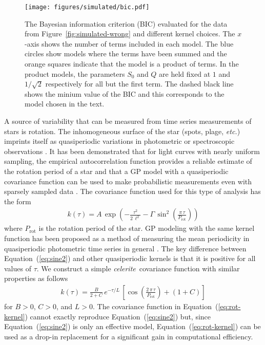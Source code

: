 \documentclass[manuscript, letterpaper]{aastex6}
\makeatletter
\let\origsubsection\subsection
\renewcommand\subsection{\@ifstar{\starsubsection}{\nostarsubsection}}
\newcommand\nostarsubsection[1]{\subsectionprelude\origsubsection{#1}}
\newcommand\starsubsection[1]{\subsectionprelude\origsubsection*{#1}}
\newcommand\subsectionprelude{\vspace{1em}}
\newcommand{\celeriteterm}{\emph{celerite}}
\newcommand{\foreign}[1]{\emph{#1}}
\newcommand{\etc}{\foreign{etc.}}
\newcommand{\figureref}[1]{\ref{fig:#1}}
\newcommand{\Figure}[1]{Figure~\figureref{#1}}
\newcommand{\figurelabel}[1]{\label{fig:#1}}
\renewcommand{\eqref}[1]{\ref{eq:#1}}
\newcommand{\Eq}[1]{Equation~(\eqref{#1})}
\newcommand{\eq}[1]{\Eq{#1}}
\newcommand{\eqlabel}[1]{\label{eq:#1}}
\newcommand{\sectlabel}[1]{\label{sect:#1}}
\newcommand{\response}[1]{{#1}}
\makeatother
\begin{document}
\begin{figure}[!hptb]
    \begin{center}
        \texttt{[image: figures/simulated/bic.pdf]}
        \caption{\response{
                The Bayesian information criterion (BIC) evaluated for the data from
                \Figure{simulated-wrong} and different kernel choices.
                The $x$-axis shows the number of terms included in each model.
                The blue circles show models where the terms have been summed and the
                orange squares indicate that the model is a product of terms.
                In the product models, the parameters $S_0$ and $Q$ are held fixed at $1$
                and $1/\sqrt{2}$ respectively for all but the first term.
                The dashed black line shows the minium value of the BIC and this
                corresponds to the model chosen in the text.}
            \figurelabel{bic}}
    \end{center}
\end{figure}

\newpage
\subsection{Example 3: Stellar rotation} \sectlabel{rotation}

A source of variability that can be measured from time series measurements of
stars is rotation.
The inhomogeneous surface of the star (spots, plage, \etc) imprints itself as
quasiperiodic variations in photometric or spectroscopic observations
\citep{Dumusque:2014}.
It has been demonstrated that for light curves with nearly uniform sampling,
the empirical autocorrelation function provides a reliable estimate of the
rotation period of a star \citep{Mcquillan:2013, Mcquillan:2014, Aigrain:2015}
and that a GP model with a
quasiperiodic covariance function can be used to make probabilistic
measurements even with sparsely sampled data \citep{Angus:2017}.
The covariance function used for this type of analysis has the form
\begin{eqnarray}\eqlabel{sine2}
    k(\tau) = A\,\exp\left(-\frac{\tau^2}{2\,\ell^2} -
    \Gamma\,\sin^2\left(\frac{\pi\,\tau}{P_\mathrm{rot}} \right) \right)
\end{eqnarray}
where $P_\mathrm{rot}$ is the rotation period of the star.
GP modeling with the same kernel function has been proposed as a method of
measuring the mean periodicity in quasiperiodic photometric time series in
general \citep{Wang:2012}.
The key difference between \eq{sine2} and other quasiperiodic kernels is that
it is positive for all values of $\tau$.
We construct a simple \celeriteterm\ covariance function with similar
properties as follows
\begin{eqnarray}\eqlabel{rot-kernel}
    k(\tau) = \frac{B}{2+C}\,e^{-\tau/L}\,\left[
        \cos\left(\frac{2\,\pi\,\tau}{P_\mathrm{rot}}\right) + (1 + C)
        \right]
\end{eqnarray}
for $B>0$, $C>0$, and $L>0$.
The covariance function in \eq{rot-kernel} cannot exactly reproduce \eq{sine2}
but, since \eq{sine2} is only an effective model, \eq{rot-kernel} can be used
as a drop-in replacement for a significant gain in computational efficiency.
\end{document}
